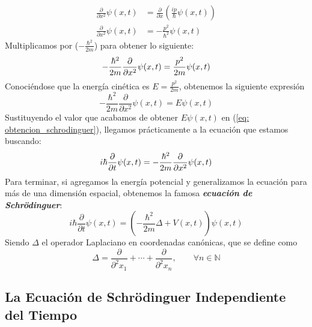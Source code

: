\documentclass{article}
\numberwithin{equation}{section} %
\begin{document}
    \begin{align*}
        \frac{\partial}{\partial x^{2}} \psi(x, t) &= \frac{\partial}{\partial x} \left( \frac{ip}{\hbar} \psi(x, t) \right) \\[10pt]
        \frac{\partial}{\partial x^{2}} \psi(x, t) &= - \frac{p^{2}}{\hbar^{2}} \psi(x, t)
    \end{align*}
    Multiplicamos por (\( - \frac{\hbar^{2}}{2m} \)) para obtener lo siguiente:
    \begin{equation*}
        - \frac{\hbar^{2}}{2m} \frac{\partial}{\partial x^{2}} \psi(x, t) = \frac{p^{2}}{2m} \psi(x, t)
        \\[2mm]
    \end{equation*}
    Conociéndose que la energía cinética es \( E = \frac{p^{2}}{2m} \), obtenemos la siguiente expresión
    \begin{equation*}
        - \frac{\hbar^{2}}{2m} \frac{\partial}{\partial x^{2}} \psi(x, t) = E \psi(x, t)
    \end{equation*}
    Sustituyendo el valor que acabamos de obtener \( E \psi(x, t) \) en (\ref{eq: obtencion_schrodinguer}), llegamos prácticamente a la ecuación que estamos buscando:
    \begin{equation*}
        i \hbar \frac{\partial}{\partial t} \psi(x, t) = - \frac{\hbar^{2}}{2m} \frac{\partial}{\partial x^{2}} \psi(x, t)
        \\[2mm]
    \end{equation*}
    Para terminar, si agregamos la energía potencial y generalizamos la ecuación para más de una dimensión espacial, obtenemos la famosa \textbf{\textit{ecuación de Schrödinguer}}:
    \begin{equation}
        \boxed{i \hbar \frac{\partial}{\partial t} \psi(x, t) = (- \frac{\hbar^{2}}{2m} \Delta + V(x, t)) \psi(x, t)} 
        \label{eq: ecuacion_schrodinguer}     
    \end{equation}
    Siendo \( \Delta \) el operador Laplaciano en coordenadas canónicas, que se define como
    \begin{equation*}
        \Delta = \frac{\partial}{\partial^{2} x_{1}} + \cdots + \frac{\partial}{\partial^{2} x_{n}}, \qquad \forall n \in \mathbb{N}
    \end{equation*}

    \vspace{5mm}

    \subsection{La Ecuación de Schrödinguer Independiente del Tiempo}
\end{document}
